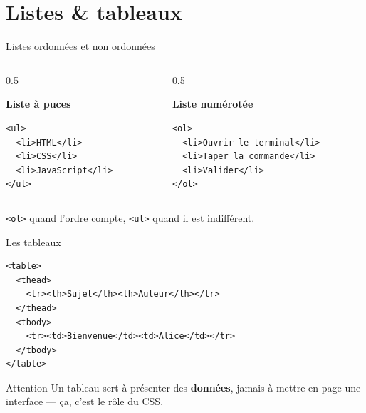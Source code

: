 \documentclass[aspectratio=169,11pt]{beamer}
\begin{document}
\section{Listes \& tableaux}
{
\begin{frame}[plain]
\end{frame}
}

\begin{frame}[fragile]{Listes ordonnées et non ordonnées}
  \begin{columns}[T]
    \begin{column}{0.5\textwidth}
      \begin{center}\footnotesize\textbf{Liste à puces}\end{center}
\begin{lstlisting}[language=HTML5]
<ul>
  <li>HTML</li>
  <li>CSS</li>
  <li>JavaScript</li>
</ul>
\end{lstlisting}
    \end{column}
    \begin{column}{0.5\textwidth}
      \begin{center}\footnotesize\textbf{Liste numérotée}\end{center}
\begin{lstlisting}[language=HTML5]
<ol>
  <li>Ouvrir le terminal</li>
  <li>Taper la commande</li>
  <li>Valider</li>
</ol>
\end{lstlisting}
    \end{column}
  \end{columns}
  \vspace{0.3cm}
  \begin{center}
    \small \texttt{<ol>} quand l'ordre compte, \texttt{<ul>} quand il est indifférent.
  \end{center}
\end{frame}

\begin{frame}[fragile]{Les tableaux}
\begin{lstlisting}[language=HTML5]
<table>
  <thead>
    <tr><th>Sujet</th><th>Auteur</th></tr>
  </thead>
  <tbody>
    <tr><td>Bienvenue</td><td>Alice</td></tr>
  </tbody>
</table>
\end{lstlisting}
  \begin{alertblock}{Attention}
    Un tableau sert à présenter des \textbf{données}, jamais à mettre en page une interface --- ça, c'est le rôle du CSS.
  \end{alertblock}
\end{frame}
\end{document}
